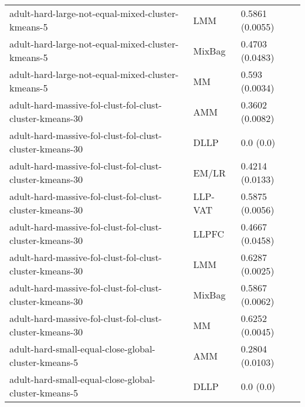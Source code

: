 \begin{longtable}{lll}
                                                            adult-hard-large-not-equal-mixed-cluster-kmeans-5 &       LMM &                           0.5861 (0.0055) \\
                                                            adult-hard-large-not-equal-mixed-cluster-kmeans-5 &    MixBag &                           0.4703 (0.0483) \\
                                                            adult-hard-large-not-equal-mixed-cluster-kmeans-5 &        MM &                            0.593 (0.0034) \\
                                                     adult-hard-massive-fol-clust-fol-clust-cluster-kmeans-30 &       AMM &                           0.3602 (0.0082) \\
                                                     adult-hard-massive-fol-clust-fol-clust-cluster-kmeans-30 &      DLLP &                                 0.0 (0.0) \\
                                                     adult-hard-massive-fol-clust-fol-clust-cluster-kmeans-30 &     EM/LR &                           0.4214 (0.0133) \\
                                                     adult-hard-massive-fol-clust-fol-clust-cluster-kmeans-30 &   LLP-VAT &                           0.5875 (0.0056) \\
                                                     adult-hard-massive-fol-clust-fol-clust-cluster-kmeans-30 &     LLPFC &                           0.4667 (0.0458) \\
                                                     adult-hard-massive-fol-clust-fol-clust-cluster-kmeans-30 &       LMM &                           0.6287 (0.0025) \\
                                                     adult-hard-massive-fol-clust-fol-clust-cluster-kmeans-30 &    MixBag &                           0.5867 (0.0062) \\
                                                     adult-hard-massive-fol-clust-fol-clust-cluster-kmeans-30 &        MM &                           0.6252 (0.0045) \\
                                                         adult-hard-small-equal-close-global-cluster-kmeans-5 &       AMM &                           0.2804 (0.0103) \\
                                                         adult-hard-small-equal-close-global-cluster-kmeans-5 &      DLLP &                                 0.0 (0.0) \\

\end{longtable}
